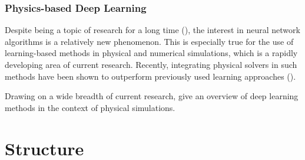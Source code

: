 \subsubsection*{Physics-based Deep Learning}
Despite being a topic of research for a long time (\cite{backprop}), the
interest in neural network algorithms is a relatively new phenomenon. This is
especially true for the use of learning-based methods in physical and numerical
simulations, which is a rapidly developing area of current research. Recently,
integrating physical solvers in such methods have been shown to outperform
previously used learning approaches (\cite{solver-in-the-loop}).

Drawing on a wide breadth of current research, \cite{pbdl} give an overview of
deep learning methods in the context of physical simulations. 


\section{Structure}

